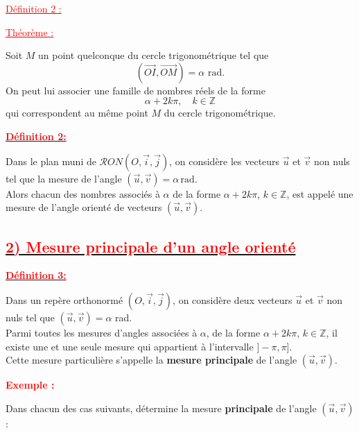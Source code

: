 \documentclass[a4paper,12pt]{article}
\begin{document}
\vspace{1em}

\noindent
\textcolor{red}{\underline{Définition 2 :}} \

\textcolor{red}{\underline{Théorème :}}

\vspace{0.5em}

Soit \( M \) un point quelconque du cercle trigonométrique tel que 
\[
(\overrightarrow{OI}, \overrightarrow{OM}) = \alpha \text{ rad}.
\]
On peut lui associer une famille de nombres réels de la forme 
\[
\alpha + 2k\pi, \quad k \in \mathbb{Z}
\]
qui correspondent au même point \( M \) du cercle trigonométrique.

\vspace{1em}
\noindent\textbf{\underline{\textcolor{red}{Définition 2:}}}
 
Dans le plan muni de \( \mathcal{R}ON(O, \vec{i}, \vec{j}) \), on considère les vecteurs \( \vec{u} \) et \( \vec{v} \) non nuls tel que la mesure de l’angle \( (\vec{u}, \vec{v}) = \alpha \, \text{rad} \).\\
Alors chacun des nombres associés à \( \alpha \) de la forme \( \alpha + 2k\pi \), \( k \in \mathbb{Z} \), est appelé une mesure de l’angle orienté de vecteurs \( (\vec{u}, \vec{v}) \).
\subsection*{\underline{\textcolor{red}{2) Mesure principale d’un angle orienté}}}

\textbf{\underline{\textcolor{red}{Définition 3:}}}

Dans un repère orthonormé \( (O, \vec{i}, \vec{j}) \), on considère deux vecteurs \( \vec{u} \) et \( \vec{v} \) non nuls tel que \( (\vec{u}, \vec{v}) = \alpha \) rad.\\
Parmi toutes les mesures d’angles associées à \( \alpha \), de la forme \( \alpha + 2k\pi \), \( k \in \mathbb{Z} \), il existe une et une seule mesure qui appartient à l’intervalle \( ]-\pi, \pi] \).\\
Cette mesure particulière s’appelle la \textbf{mesure principale} de l’angle \( (\vec{u}, \vec{v}) \).

\vspace{1em}

\textcolor{red}{\textbf{Exemple :}} 

Dans chacun des cas suivants, détermine la mesure \textbf{principale} de l’angle \( (\vec{u}, \vec{v}) \) :
\end{document}
